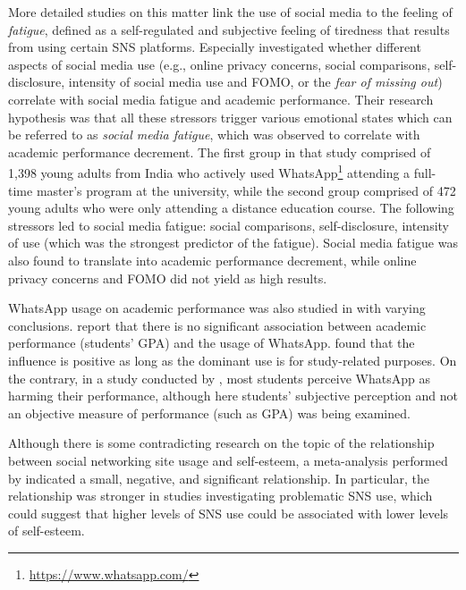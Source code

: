 \documentclass[a4paper,fleqn]{cas-dc}
\begin{document}
More detailed studies on this matter link the use of social media to the feeling of \textit{fatigue}, defined as a self-regulated and subjective feeling of tiredness that results from using certain SNS platforms. Especially \citet{malik2020correlates} investigated whether different aspects of social media use (e.g., online privacy concerns, social comparisons, self-disclosure, intensity of social media use and FOMO, or the \textit{fear of missing out})
 correlate with social media fatigue and academic performance. Their research hypothesis was that all these  stressors  trigger various emotional states which can be referred to as \textit{social media fatigue}, which was observed to  correlate with  academic performance decrement. 
The first group in that study comprised of 1,398 young adults from India who actively used WhatsApp\footnote{\url{https://www.whatsapp.com/}} attending a full-time master's program at the university, while the second group comprised of  472 young adults who were only attending a distance education course. The following stressors led to social media fatigue: social comparisons, self-disclosure, intensity of use (which was the strongest predictor of the fatigue). Social media fatigue was also found to translate into academic performance decrement, while online privacy concerns and FOMO did not yield as high results.

WhatsApp usage on academic performance was also studied in \citep{Alkhalaf2018, Afful2020, yeboah2014impact} with varying conclusions. \citet{Alkhalaf2018} report that there is no significant association between academic performance (students' GPA) and the usage of WhatsApp. \citet{Afful2020} found that the influence is positive as long as the dominant use is for study-related purposes. On the contrary, in a study conducted by \citet{yeboah2014impact}, most students perceive WhatsApp as harming their performance, although here  students' subjective perception and  not an objective measure of performance (such as  GPA) was being examined.


Although there is some contradicting research on the topic of the relationship between social networking site usage and self-esteem, a meta-analysis performed by \citet{saiphoo2020social} indicated a small, negative, and significant relationship. In particular, the relationship was stronger in studies investigating problematic SNS use, which could suggest that higher levels of SNS use could be associated with lower levels of self-esteem.
\end{document}
